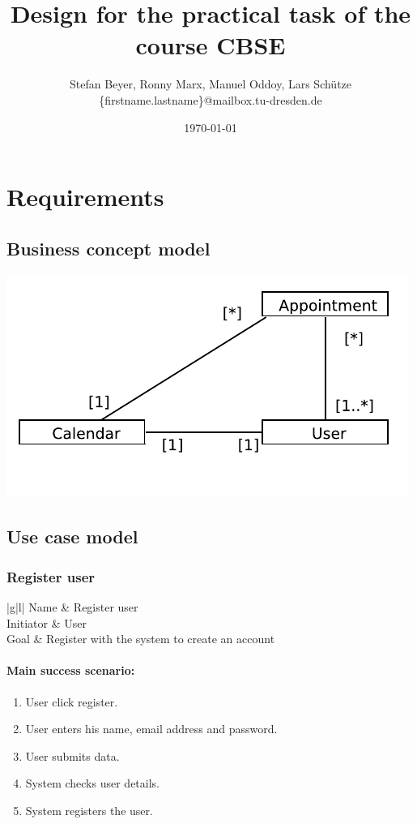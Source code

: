 \documentclass[a4paper]{scrartcl}
\title{Design for the practical task of the course CBSE}
\author{Stefan Beyer, Ronny Marx, Manuel Oddoy, Lars Schütze \\
	\{firstname.lastname\}@mailbox.tu-dresden.de}
\date{\today}
\begin{document}
\maketitle
\pagebreak

\tableofcontents
\pagebreak

\section{Requirements}
\subsection{Business concept model}

\includegraphics{pictures/BusinessConceptModel}

\subsection{Use case model}
\subsubsection{Register user}

\begin{tabular}{|g|l|}
	\hline Name      & Register user                                 \\ 
	\hline Initiator & User                                          \\ 
	\hline Goal      & Register with the system to create an account \\ 
	\hline
\end{tabular}

\paragraph{Main success scenario:}
\begin{enumerate}
	\item User click register.
	\item User enters his name, email address and password.
	\item User submits data.
	\item System checks user details.
	\item System registers the user.
\end{enumerate}
\end{document}
